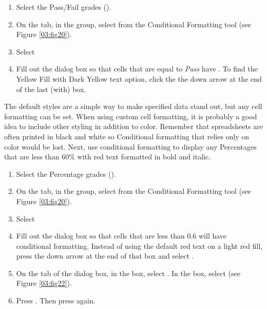 \begin{enumerate}
	\item Select the Pass/Fail grades ().
	\item On the  tab, in the  group, select  from the Conditional Formatting tool (see Figure \ref{03:fig20}).
	\item Select 
	\item Fill out the  dialog box so that cells that are equal to \textit{Pass} have . To find the Yellow Fill with Dark Yellow text option, click the the down arrow at the end of the last (with) box.
\end{enumerate}

The default styles are a simple way to make specified data stand out, but any cell formatting can be set. When using custom cell formatting, it is probably a good idea to include other styling in addition to color. Remember that spreadsheets are often printed in black and white so Conditional formatting that relies only on color would be lost. Next, use conditional formatting to display any Percentages that are less than $ 60\% $ with red text formatted in bold and italic.

\begin{enumerate}
	\item Select the Percentage grades ().
	\item On the  tab, in the  group, select  from the Conditional Formatting tool (see Figure \ref{03:fig20}).
	\item Select 
	\item Fill out the  dialog box so that cells that are less than $ 0.6 $ will have conditional formatting. Instead of using the default red text on a light red fill, press the down arrow at the end of that box and select .
	\item On the  tab of the  dialog box, in the  box, select . In the  box, select  (see Figure \ref{03:fig22}).
	\item Press . Then press  again.
\end{enumerate}

